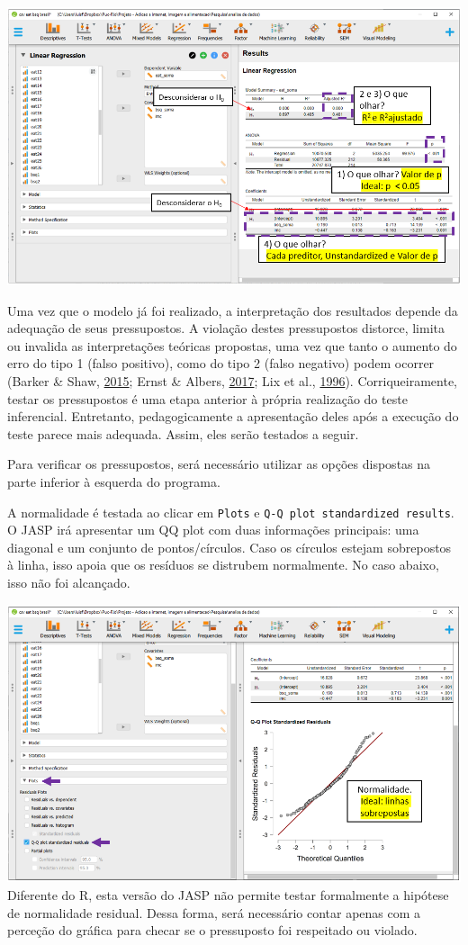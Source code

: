 \documentclass[
]{book}
\begin{document}
\includegraphics{./img/cap_reg_multipla_resultado_5.png}

Uma vez que o modelo já foi realizado, a interpretação dos resultados
depende da adequação de seus pressupostos. A violação destes
pressupostos distorce, limita ou invalida as interpretações teóricas
propostas, uma vez que tanto o aumento do erro do tipo 1 (falso
positivo), como do tipo 2 (falso negativo) podem ocorrer (Barker \&
Shaw, \protect\hyperlink{ref-Barker2015}{2015}; Ernst \& Albers,
\protect\hyperlink{ref-Ernst2017}{2017}; Lix et al.,
\protect\hyperlink{ref-Lix1996}{1996}). Corriqueiramente, testar os
pressupostos é uma etapa anterior à própria realização do teste
inferencial. Entretanto, pedagogicamente a apresentação deles após a
execução do teste parece mais adequada. Assim, eles serão testados a
seguir.

Para verificar os pressupostos, será necessário utilizar as opções
dispostas na parte inferior à esquerda do programa.

A normalidade é testada ao clicar em \texttt{Plots} e
\texttt{Q-Q\ plot\ standardized\ results}. O JASP irá apresentar um QQ
plot com duas informações principais: uma diagonal e um conjunto de
pontos/círculos. Caso os círculos estejam sobrepostos à linha, isso
apoia que os resíduos se distrubem normalmente. No caso abaixo, isso não
foi alcançado.

\includegraphics{./img/cap_reg_multipla_normalidade.png} Diferente do R,
esta versão do JASP não permite testar formalmente a hipótese de
normalidade residual. Dessa forma, será necessário contar apenas com a
perceção do gráfica para checar se o pressuposto foi respeitado ou
violado.
\end{document}

